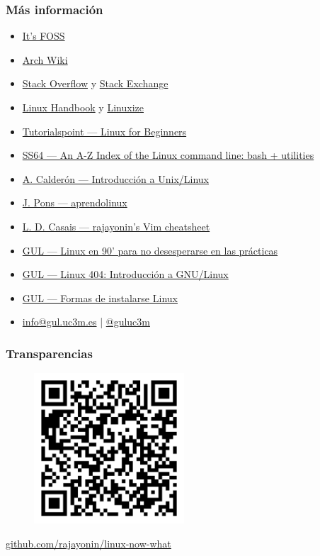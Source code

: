 \documentclass[aspectratio=43]{beamer}
\begin{document}
\begin{frame}
    \frametitle{Más información}

    \begin{itemize}
        \item \href{https://itsfoss.com/}{It's FOSS}
        \item \href{https://wiki.archlinux.org/}{Arch Wiki}
        \item \href{https://stackoverflow.com/}{Stack Overflow} y \href{https://stackoverflow.com/}{Stack Exchange}
        \item \href{https://stackoverflow.com/}{Linux Handbook} y \href{https://linuxize.com/}{Linuxize}
        \item \href{https://www.tutorialspoint.com/unix/index.htm}{Tutorialspoint — Linux for Beginners}
        \item \href{https://ss64.com/bash/}{SS64 — An A-Z Index of the Linux command line: bash + utilities}
        \item \href{https://github.com/acaldero/uc3m_linux}{A. Calderón — Introducción a Unix/Linux}
        \item \href{https://aprendolinux.com}{J. Pons — aprendolinux}
        \item \href{https://github.com/rajayonin/cheatsheets/blob/main/vim_cheatsheet.md}{L. D. Casais — rajayonin's Vim cheatsheet}
        \item \href{https://youtu.be/2qZBUa93MQ8}{GUL — Linux en 90' para no desesperarse en las prácticas}
        \item \href{https://cloud-gul.uc3m.es/s/4qXKozr7DmDSZiN}{GUL — Linux 404: Introducción a GNU/Linux}
        \item \href{https://github.com/guluc3m/linux404/blob/main/README.md}{GUL — Formas de instalarse Linux}
        \item \href{mailto:info@gul.uc3m.es}{info@gul.uc3m.es} | \href{https://twitter.com/guluc3m}{@guluc3m}
    \end{itemize}

\end{frame}


\begin{frame}
    \frametitle{Transparencias}
    \centering
    
    \begin{figure}
        \includegraphics[width=0.5\textwidth]{img/qr-code.png}
    \end{figure}

    \href{https://github.com/rajayonin/linux-now-what}{github.com/rajayonin/linux-now-what}

\end{frame}
\end{document}
